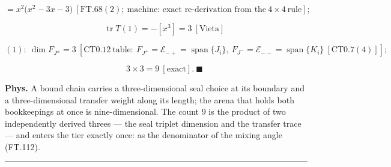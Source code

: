 \begin{theorem}
\[
= x^2\bigl(x^2-3x-3\bigr)\ [\mathrm{FT.68}(2);\ \text{machine: exact re-derivation from the}\ 4\times4\ \text{rule}];
\]

\[
\qquad \operatorname{tr}T(1)=-[x^3]=3\ [\text{Vieta}]
\]

\[
(1):\ \dim F_{J^\pm}=3\ [\mathrm{CT0.12}\ \text{table}:\ F_{J^+}=\mathcal E_{-+}=\operatorname{span}\{J_i\},\ F_{J^-}=\mathcal E_{--}=\operatorname{span}\{K_i\}\ [\mathrm{CT0.7}(4)]];
\]

\[
\qquad 3\times3=9\ [\text{exact}].\ \blacksquare
\]

\textbf{Phys.} A bound chain carries a three-dimensional seal choice at its boundary and a three-dimensional transfer weight along its length; the arena that holds both bookkeepings at once is nine-dimensional. The count $9$ is the product of two independently derived threes — the seal triplet dimension and the transfer trace — and enters the tier exactly once: as the denominator of the mixing angle (FT.112).

\vspace{2pt}\noindent\rule{\textwidth}{0.4pt}\vspace{2pt}

\end{theorem}

